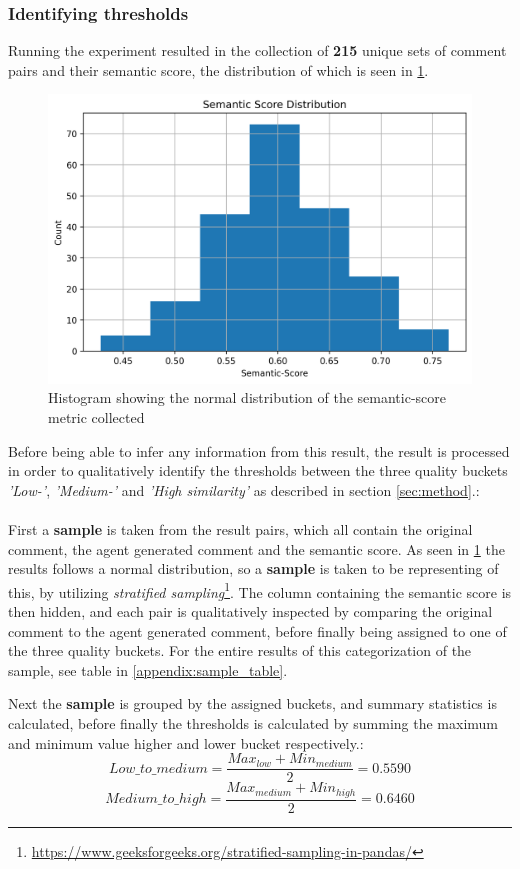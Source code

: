 \subsubsection{Identifying thresholds}
\label{sec:identifying thresholds}
Running the experiment resulted in the collection of \textbf{215} unique sets of comment pairs and their semantic score, the distribution of which is seen in \cref{fig:sem_hist}.
\begin{figure}[H]
\centering
\includegraphics[width=0.7\linewidth]{Figures/semantic_score_histogram.png}
\caption{Histogram showing the normal distribution of the semantic-score metric collected}
\label{fig:sem_hist}
\end{figure}

Before being able to infer any information from this result, the result is processed in order to qualitatively identify the thresholds between the three quality buckets \textit{'Low-'}, \textit{'Medium-'} and \textit{'High similarity'} as described in section \cref{sec:method}.:
\\\\
First a \textbf{sample} is taken from the result pairs, which all contain the original comment, the agent generated comment and the semantic score. As seen in \cref{fig:sem_hist} the results follows a normal distribution, so a \textbf{sample} is taken to be representing of this, by utilizing \textit{stratified sampling}\footnote{\url{https://www.geeksforgeeks.org/stratified-sampling-in-pandas/}}. The column containing the semantic score is then hidden, and each pair is qualitatively inspected by comparing the original comment to the agent generated comment, before finally being assigned to one of the three quality buckets. For the entire results of this categorization of the sample, see table in \cref{appendix:sample_table}.

Next the \textbf{sample} is grouped by the assigned buckets, and summary statistics is calculated, before finally the thresholds is calculated by summing the maximum and minimum value higher and lower bucket respectively.:
\[
Low\_to\_medium = \frac{Max_{low}+Min_{medium}}{2} = 0.5590
\]
\[
Medium\_to\_high = \frac{Max_{medium}+Min_{high}}{2} = 0.6460
\]

